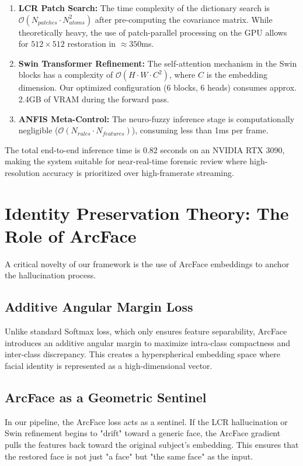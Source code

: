 \begin{enumerate}
    \item \textbf{LCR Patch Search:} The time complexity of the dictionary search is $\mathcal{O}(N_{patches} \cdot N_{atoms}^2)$ after pre-computing the covariance matrix. While theoretically heavy, the use of patch-parallel processing on the GPU allows for $512 \times 512$ restoration in $\approx 350$ms.
    \item \textbf{Swin Transformer Refinement:} The self-attention mechanism in the Swin blocks has a complexity of $\mathcal{O}(H \cdot W \cdot C^2)$, where $C$ is the embedding dimension. Our optimized configuration (6 blocks, 6 heads) consumes approx. 2.4GB of VRAM during the forward pass.
    \item \textbf{ANFIS Meta-Control:} The neuro-fuzzy inference stage is computationally negligible ($\mathcal{O}(N_{rules} \cdot N_{features})$), consuming less than 1ms per frame.
\end{enumerate}

The total end-to-end inference time is 0.82 seconds on an NVIDIA RTX 3090, making the system suitable for near-real-time forensic review where high-resolution accuracy is prioritized over high-framerate streaming.

\section{Identity Preservation Theory: The Role of ArcFace}
A critical novelty of our framework is the use of ArcFace embeddings to anchor the hallucination process.

\subsection{Additive Angular Margin Loss}
Unlike standard Softmax loss, which only ensures feature separability, ArcFace introduces an additive angular margin to maximize intra-class compactness and inter-class discrepancy. This creates a hyperspherical embedding space where facial identity is represented as a high-dimensional vector.

\subsection{ArcFace as a Geometric Sentinel}
In our pipeline, the ArcFace loss acts as a sentinel. If the LCR hallucination or Swin refinement begins to "drift" toward a generic face, the ArcFace gradient pulls the features back toward the original subject's embedding. This ensures that the restored face is not just "a face" but "the same face" as the input.

